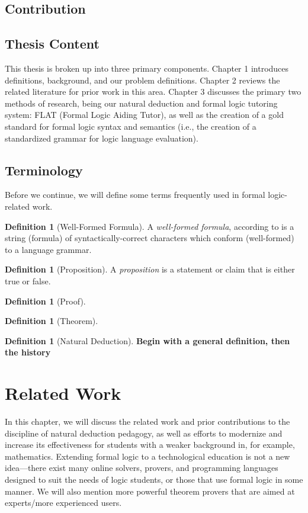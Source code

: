 \documentclass[ms]{uncgdissertationexp2}
\theoremstyle{plain}
\theoremstyle{definition}
\newtheorem{definition}[theorem]{Definition}
\theoremstyle{remark}
\begin{document}
\section{Contribution}
\section{Thesis Content}
This thesis is broken up into three primary components. Chapter 1 introduces definitions, background, and our problem definitions. Chapter 2 reviews the related literature for prior work in this area. Chapter 3 discusses the primary two methods of research, being our natural deduction and formal logic tutoring system: FLAT (Formal Logic Aiding Tutor), as well as the creation of a gold standard for formal logic syntax and semantics (i.e., the creation of a standardized grammar for logic language evaluation).
\section{Terminology}
Before we continue, we will define some terms frequently used in formal logic-related work.
\begin{definition}[Well-Formed Formula]
	A \textit{well-formed formula}, according to \cite{encyclopedia} is a string (formula) of syntactically-correct characters which conform (well-formed) to a language grammar.
\end{definition}
    
\begin{definition}[Proposition]
	A \textit{proposition} is a statement or claim that is either true or false.
\end{definition}

\begin{definition}[Proof]
\end{definition}
    
\begin{definition}[Theorem]
\end{definition}

\begin{definition}[Natural Deduction]
	\textbf{Begin with a general definition, then the history}
\end{definition}

\chapter{Related Work}
In this chapter, we will discuss the related work and prior contributions to the discipline of natural deduction pedagogy, as well as efforts to modernize and increase its effectiveness for students with a weaker background in, for example, mathematics. 
Extending formal logic to a technological education is not a new idea---there exist many online solvers, provers, and programming languages designed to suit the needs of logic students, or those that use formal logic in some manner. We will also mention more powerful theorem provers that are aimed at experts/more experienced users.
\end{document}
